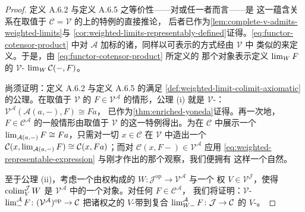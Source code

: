 \begin{proof}
定义 A.6.2 与定义 A.6.5 之等价性——对\trWeightedLimit{}或\trWeightedColimit{}任一者而言——是
这一蕴含关系在取值于 $\mathcal{C}=\mathcal{V}$ 的\trWeightedLimit{}上的特例的直接推论，
后者已作为\cref{lem:complete-v-admits-weighted-limits}与%
\cref{cor:weighted-limits-representably-defined}证得。\eqref{eq:functor-cotensor-product}
中对 $\mathcal{A}$ 加标的诸\trLimit，同样以可表示的方式经由 $\mathcal{V}$ 中
类似的\trLimit{}来定义。于是，由 \eqref{eq:functor-cotensor-product} 所定义的
那个对象表示定义\trWeightedLimit{} $\operatorname{lim}_{W}F$ 的 $\mathcal{V}$-\trFunctor{}
$\operatorname{lim}_{W}\mathcal{C}(-,F)$。

尚须证明：定义 A.6.2 与定义 A.6.5 的\trWeightedLimit{}满足%
\cref{def:weighted-limit-colimit-axiomatic}的公理。在取值于 $\mathcal{V}$ 的%
\trDiagram{} $F\in\mathcal{V}^{\mathcal{A}}$ 的情形，公理 (i) 就是
$\mathcal{V}$-\trYonedaLemma：$\mathcal{V}^{\mathcal{A}}(\mathcal{A}(a,-),F)\cong Fa$，
已作为\cref{thm:enriched-yoneda}证得。再一次地，$F\in\mathcal{C}^{\mathcal{A}}$
的一般情形由取值于 $\mathcal{V}$ 的\trDiagram{}这一特例得出。为在 $\mathcal{C}$
中展示一个\trIsomorphism{} $\operatorname{lim}_{\mathcal{A}(a,-)}F\cong Fa$，只需对一切
$x\in\mathcal{C}$ 在 $\mathcal{V}$ 中造出一个\trIsomorphism{}
$\mathcal{C}(x,\operatorname{lim}_{\mathcal{A}(a,-)}F)\cong\mathcal{C}(x,Fa)$；而对%
\trFunctor{} $\mathcal{C}(x,F-)\in\mathcal{V}^{\mathcal{A}}$ 应用
\eqref{eq:weighted-representable-expression} 与刚才作出的那个观察，我们便拥有
这样一个自然\trIsomorphism。

至于公理 (ii)，考虑一个由权构成的\trDiagram{}
$W\colon\mathcal{J}^{\mathrm{op}}\to\mathcal{V}^{\mathcal{A}}$ 与一个
权 $V\in\mathcal{V}^{\mathcal{J}}$，使得 $\operatorname{colim}^{\mathcal{J}}_{V}W$ 是
$\mathcal{V}^{\mathcal{A}}$ 中的一个对象。对任何 $F\in\mathcal{C}^{\mathcal{A}}$，
我们将证明：$\mathcal{V}$-\trFunctor{}
$\operatorname{lim}^{\mathcal{A}}_{-}F\colon(\mathcal{V}^{\mathcal{A}})^{\mathrm{op}}\to\mathcal{C}$
把诸权之\trDiagram{}的 $V$-\trWeightedColimit{}带到复合\trDiagram{}
$\operatorname{lim}^{\mathcal{A}}_{W-}F\colon\mathcal{J}\to\mathcal{C}$ 的 $V$-\trWeightedLimit。


\end{proof}
